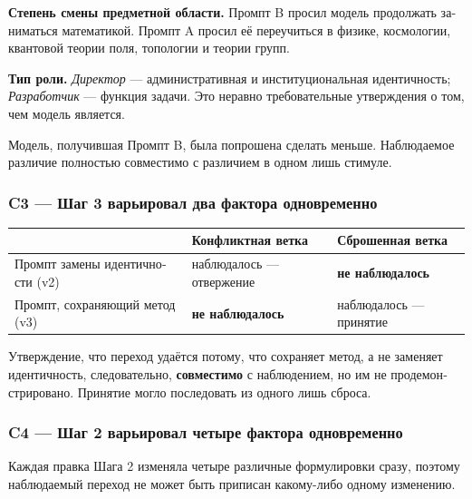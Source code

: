 \begin{russian}
\textbf{Степень смены предметной области.} Промпт B просил модель продолжать заниматься математикой. Промпт A просил её переучиться в физике, космологии, квантовой теории поля, топологии и теории групп.

\textbf{Тип роли.} \emph{Директор} — административная и институциональная идентичность; \emph{Разработчик} — функция задачи. Это неравно требовательные утверждения о том, чем модель является.

Модель, получившая Промпт B, была попрошена сделать меньше. Наблюдаемое различие полностью совместимо с различием в одном лишь стимуле.


\subsubsection*{C3 — Шаг 3 варьировал два фактора одновременно}
\label{sec:ru:x-c3-3}

\begin{center}
\small
\begin{tabularx}{\linewidth}{>{\raggedright\arraybackslash}X>{\raggedright\arraybackslash}X>{\raggedright\arraybackslash}X}
\toprule
 & \textbf{Конфликтная ветка} & \textbf{Сброшенная ветка} \\
\midrule
Промпт замены идентичности (v2) & наблюдалось — отвержение & \textbf{не наблюдалось} \\
Промпт, сохраняющий метод (v3) & \textbf{не наблюдалось} & наблюдалось — принятие \\
\bottomrule
\end{tabularx}
\end{center}
Утверждение, что переход удаётся потому, что сохраняет метод, а не заменяет идентичность, следовательно, \textbf{совместимо} с наблюдением, но им не продемонстрировано. Принятие могло последовать из одного лишь сброса.


\subsubsection*{C4 — Шаг 2 варьировал четыре фактора одновременно}
\label{sec:ru:x-c4-2}

Каждая правка Шага 2 изменяла четыре различные формулировки сразу, поэтому наблюдаемый переход не может быть приписан какому-либо одному изменению.



\end{russian}
